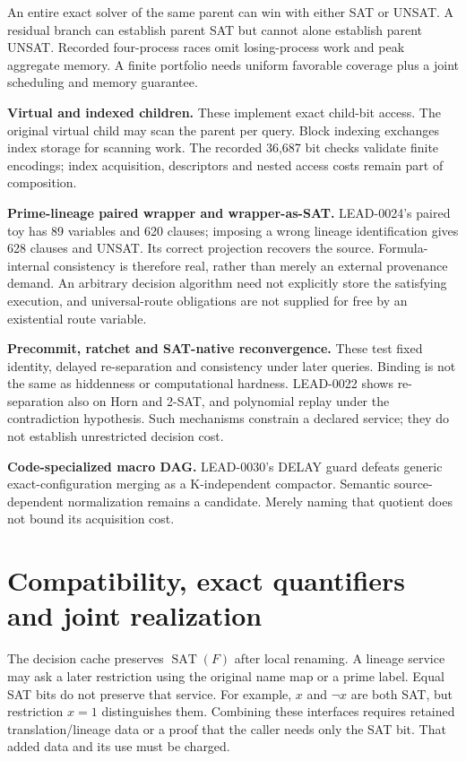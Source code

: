 \documentclass[11pt]{article}
\begin{document}
\begin{description}
An entire exact solver of the same parent can win with either SAT or UNSAT.
A residual branch can establish parent SAT but cannot alone establish parent
UNSAT. Recorded four-process races omit losing-process work and peak aggregate
memory. A finite portfolio needs uniform favorable coverage plus a joint
scheduling and memory guarantee.
\item[] \textbf{Virtual and indexed children.}
These implement exact child-bit access. The original virtual child may scan the
parent per query. Block indexing exchanges index storage for scanning work.
The recorded 36,687 bit checks validate finite encodings; index acquisition,
descriptors and nested access costs remain part of composition.
\item[] \textbf{Prime-lineage paired wrapper and wrapper-as-SAT.}
LEAD-0024's paired toy has 89 variables and 620 clauses; imposing a wrong lineage
identification gives 628 clauses and UNSAT. Its correct projection recovers the
source. Formula-internal consistency is therefore real, rather than merely an
external provenance demand. An arbitrary decision algorithm need not explicitly
store the satisfying execution, and universal-route obligations are not supplied
for free by an existential route variable.
\item[] \textbf{Precommit, ratchet and SAT-native reconvergence.}
These test fixed identity, delayed re-separation and consistency under later
queries. Binding is not the same as hiddenness or computational hardness.
LEAD-0022 shows re-separation also on Horn and 2-SAT, and polynomial replay under
the contradiction hypothesis. Such mechanisms constrain a declared service;
they do not establish unrestricted decision cost.
\item[] \textbf{Code-specialized macro DAG.}
LEAD-0030's DELAY guard defeats generic exact-configuration merging as a
K-independent compactor. Semantic source-dependent normalization remains a
candidate. Merely naming that quotient does not bound its acquisition cost.
\end{description}

\section*{Compatibility, exact quantifiers and joint realization}
The decision cache preserves $\operatorname{SAT}(F)$ after local renaming. A
lineage service may ask a later restriction using the original name map or a
prime label. Equal SAT bits do not preserve that service. For example, $x$ and
$\neg x$ are both SAT, but restriction $x=1$ distinguishes them. Combining these
interfaces requires retained translation/lineage data or a proof that the caller
needs only the SAT bit. That added data and its use must be charged.
\end{document}
